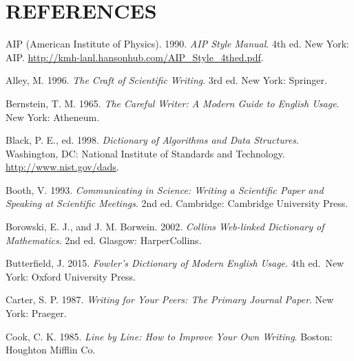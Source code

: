 \documentclass{wscpaperproc}
\newcommand{\comment}[1]{}
\theoremstyle{wsc}
\begin{document}
\section*{REFERENCES}
\begin{hangref}

\item
AIP (American Institute of Physics).  1990.  {\em AIP Style Manual}. 4th
ed.  New York: AIP\@.  \href{http://kmh-lanl.hansonhub.com/AIP_Style_4thed.pdf}%
{\url{http://kmh-lanl.hansonhub.com/AIP_Style_4thed.pdf}}\textcolor{black}{.}

\item
Alley, M\@.  1996.  \textit{The Craft of Scientific Writing}.  3rd ed.  New
York: Springer.

\item
Bernstein, T. M\@.  1965.  {\it The Careful Writer: A Modern Guide to English
Usage}.  New York: Atheneum.

\item
Black, P. E., ed\@.  1998.  \textit{Dictionary of Algorithms and Data
Structures}. Washington, DC: National Institute of Standards and
Technology.   \href{http://www.nist.gov/dads/}%
{\url{http://www.nist.gov/dads}}\textcolor{black}{.}

\item
Booth, V\@. 1993.  {\it Communicating in Science: Writing a Scientific Paper
and Speaking at Scientific Meetings}.  2nd ed.  Cambridge: Cambridge University
Press.

\item
Borowski, E. J., and J. M. Borwein.  2002.  \textit{Collins Web-linked
Dictionary of Mathematics}.  2nd ed.  Glasgow: HarperCollins.

\item
Butterfield, J.  2015.  {\em Fowler's Dictionary of Modern English Usage}.
4th ed.\ New York: Oxford University Press.


\item
Carter, S. P\@. 1987. {\it Writing for Your Peers: The Primary Journal Paper}.
New York: Praeger.

\item
Cook, C. K\@.  1985.  {\it Line by Line: How to Improve Your Own Writing}.
Boston: Houghton Mifflin Co.

\comment{
\item
Day, R. A., and N. Sakaduski. 2011.  \textit{Scientific English: A Guide
for Scientists and Other Professionals}.  3rd ed.  Santa Barbara, CA: Greenwood.
}


\end{hangref}
\end{document}
